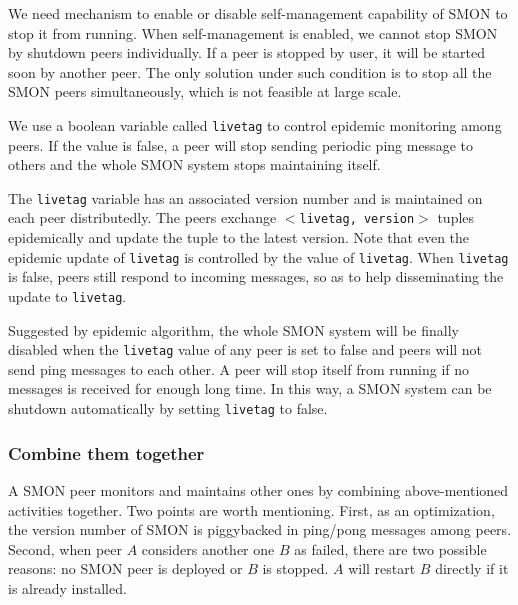 We need mechanism to enable or disable self-management
capability of SMON to stop it from running. When
self-management is enabled, we cannot stop SMON by shutdown
peers individually.  If a peer is stopped by user, it will
be started soon by another peer. The only solution under
such condition is to stop all the SMON peers simultaneously,
which is not feasible at large scale.

We use a boolean variable called \texttt{livetag} to control epidemic
monitoring among peers. If the value is false, a peer will
stop sending periodic ping message to others and the whole
SMON system stops maintaining itself. 

The \texttt{livetag} variable has an associated version
number and is maintained on each peer distributedly. The
peers exchange \texttt{$<$livetag, version$>$} tuples
epidemically and update the tuple to the latest version.
Note that even the epidemic update of \texttt{livetag} is
controlled by the value of \texttt{livetag}.  When
\texttt{livetag} is false, peers still respond
to incoming messages, so as to
help disseminating the update to \texttt{livetag}.

Suggested by epidemic algorithm, the whole SMON system will
be finally disabled when the \texttt{livetag} value of any
peer is set to false and peers will not send ping messages
to each other. A peer will stop itself from running if no
messages is received for enough long time. In this way, a
SMON system can be shutdown automatically by setting
\texttt{livetag} to false.

\subsubsection*{Combine them together}

A SMON peer monitors and maintains other ones by combining
above-mentioned activities together.  Two points are
worth mentioning. First, as an optimization, the version
number of SMON is piggybacked in ping/pong messages among
peers.  Second, when peer $A$ considers another one $B$ as
failed, there are two possible reasons: no SMON peer is
deployed or $B$ is stopped. $A$ will restart $B$ directly
if it is already installed. 





